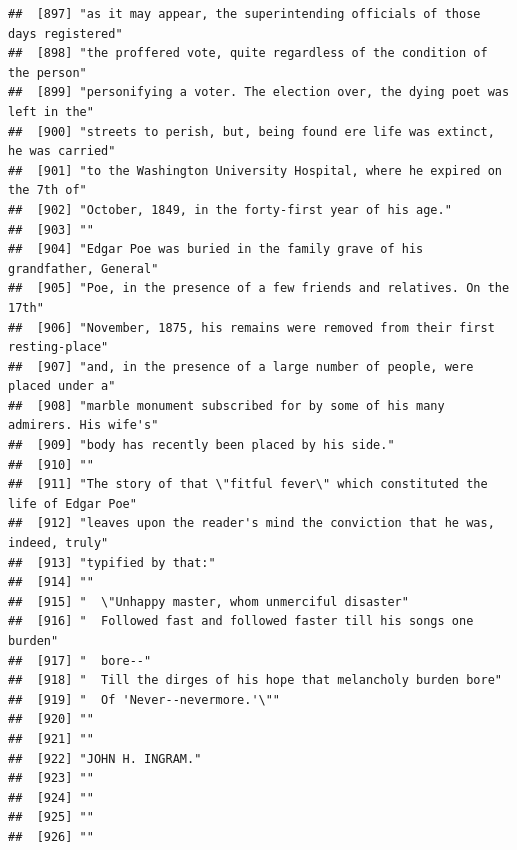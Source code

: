 \documentclass{article}\usepackage[]{graphicx}\usepackage[]{color}
\makeatletter
\newenvironment{kframe}{%
 \def\at@end@of@kframe{}%
 \ifinner\ifhmode%
  \def\at@end@of@kframe{\end{minipage}}%
  \begin{minipage}{\columnwidth}%
 \fi\fi%
 \def\FrameCommand##1{\hskip\@totalleftmargin \hskip-\fboxsep
 \colorbox{shadecolor}{##1}\hskip-\fboxsep
     \hskip-\linewidth \hskip-\@totalleftmargin \hskip\columnwidth}%
 \MakeFramed {\advance\hsize-\width
   \@totalleftmargin\z@ \linewidth\hsize
   \@setminipage}}%
 {\par\unskip\endMakeFramed%
 \at@end@of@kframe}
\newenvironment{knitrout}{}{} %
\makeatother
\begin{document}
\begin{knitrout}
\begin{kframe}
\begin{verbatim}
##  [897] "as it may appear, the superintending officials of those days registered"     
##  [898] "the proffered vote, quite regardless of the condition of the person"         
##  [899] "personifying a voter. The election over, the dying poet was left in the"     
##  [900] "streets to perish, but, being found ere life was extinct, he was carried"    
##  [901] "to the Washington University Hospital, where he expired on the 7th of"       
##  [902] "October, 1849, in the forty-first year of his age."                          
##  [903] ""                                                                            
##  [904] "Edgar Poe was buried in the family grave of his grandfather, General"        
##  [905] "Poe, in the presence of a few friends and relatives. On the 17th"            
##  [906] "November, 1875, his remains were removed from their first resting-place"     
##  [907] "and, in the presence of a large number of people, were placed under a"       
##  [908] "marble monument subscribed for by some of his many admirers. His wife's"     
##  [909] "body has recently been placed by his side."                                  
##  [910] ""                                                                            
##  [911] "The story of that \"fitful fever\" which constituted the life of Edgar Poe"  
##  [912] "leaves upon the reader's mind the conviction that he was, indeed, truly"     
##  [913] "typified by that:"                                                           
##  [914] ""                                                                            
##  [915] "  \"Unhappy master, whom unmerciful disaster"                                
##  [916] "  Followed fast and followed faster till his songs one burden"               
##  [917] "  bore--"                                                                    
##  [918] "  Till the dirges of his hope that melancholy burden bore"                   
##  [919] "  Of 'Never--nevermore.'\""                                                  
##  [920] ""                                                                            
##  [921] ""                                                                            
##  [922] "JOHN H. INGRAM."                                                             
##  [923] ""                                                                            
##  [924] ""                                                                            
##  [925] ""                                                                            
##  [926] ""                                                                            

\end{verbatim}
\end{kframe}
\end{knitrout}
\end{document}
